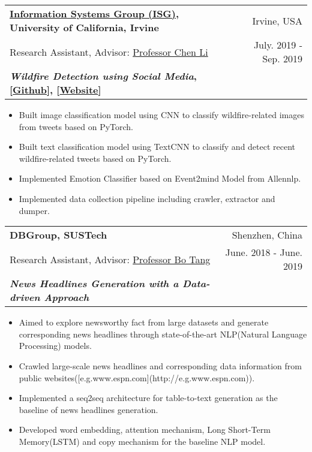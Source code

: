 \documentclass[letterpaper,11pt]{article}
\makeatletter
\newcommand{\resumeSubheading}[6]{
  \vspace{-1pt}\item
    \begin{tabular*}{0.97\textwidth}[t]{l@{\extracolsep{\fill}}r}
      \textbf{#1} & #2 \\
      #3 & #4 \\
      \textbf{#5} & \textbf{#6} \\
    \end{tabular*}\vspace{-5pt}
}
\makeatother
\begin{document}
    \resumeSubheading

      {\href{<https://isg.ics.uci.edu/>}{Information Systems Group (ISG)}, University of California, Irvine}{Irvine, USA}

      {Research Assistant, Advisor: \href{<https://chenli.ics.uci.edu/>}{Professor Chen Li}}{July. 2019 - Sep. 2019}

      {\textit{Wildfire Detection using Social Media}, [\href{<https://github.com/Yicong-Huang/Wildfires>}{Github}], [\href{<http://wildfires.ics.uci.edu:2333/>}{Website}]}{}
      

        \begin{itemize}

          \item Built image classification model using CNN to classify wildfire-related images from tweets based on PyTorch.

          \item Built text classification model using TextCNN to classify and detect recent wildfire-related tweets based on PyTorch.

          \item Implemented Emotion Classifier based on Event2mind Model from Allennlp.

          \item Implemented data collection pipeline including crawler, extractor and dumper.

        \end{itemize}

        

    \resumeSubheading

      {DBGroup, SUSTech}{Shenzhen, China}

      {Research Assistant, Advisor: \href{<https://acm.sustech.edu.cn/btang/>}{Professor Bo Tang}}{June. 2018 - June. 2019}

      {\textit{News Headlines Generation with a Data-driven Approach}}{}

      

        \begin{itemize}

          \item Aimed to explore newsworthy fact from large datasets and generate corresponding news headlines through state-of-the-art NLP(Natural Language Processing) models. 

          \item Crawled large-scale news headlines and corresponding data information from public websites([e.g.www.espn.com](http://e.g.www.espn.com)).

          \item Implemented a seq2seq architecture for table-to-text generation as the baseline of news headlines generation.

          \item Developed word embedding, attention mechanism, Long Short-Term Memory(LSTM) and copy mechanism for the baseline NLP model.



        \end{itemize}
\end{document}
